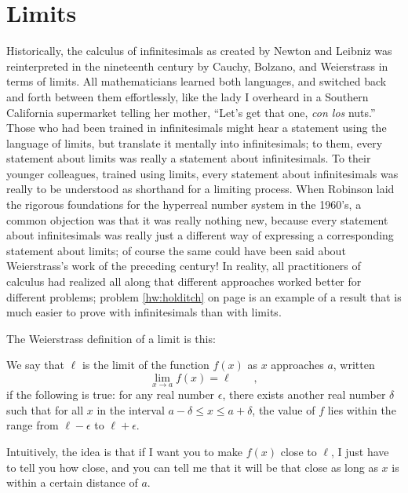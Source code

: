 \section{Limits}\label{sec:limits}

Historically, the calculus of infinitesimals as created by Newton and Leibniz was reinterpreted
in the nineteenth century by Cauchy, Bolzano, and Weierstrass in terms of limits. All mathematicians
learned both languages, and switched back and forth between them effortlessly, like the lady I
overheard in a Southern California supermarket telling her mother, ``Let's get that one, \emph{con los} nuts.''
Those who had been trained in infinitesimals might hear a statement using the language of limits, but
translate it mentally into infinitesimals; to them, every statement about limits was really a statement
about infinitesimals. To their younger colleagues, trained using limits, every statement about infinitesimals
was really to be understood as shorthand for a limiting process. When Robinson laid the rigorous foundations
for the hyperreal number system in the 1960's, a common objection was that it was really nothing new, because
every statement about infinitesimals was really just a different way of expressing a corresponding statement
about limits; of course the same could have been said about Weierstrass's work of the preceding century!
In reality, all practitioners of calculus had realized all along that different approaches worked better for
different problems; problem \ref{hw:holditch} on page \pageref{hw:holditch} is an example of a result that
is much easier to prove with infinitesimals than with limits.

The Weierstrass definition of a limit is this:
\begin{important}
We say that $\ell$ is the limit of the function $f(x)$ as $x$ approaches $a$, written
\begin{equation*}
  \lim_{x\rightarrow a} f(x) = \ell \qquad ,
\end{equation*}
if the following is true: for any real number $\epsilon$, there exists another real number
$\delta$ such that for all $x$ in the interval $a-\delta\le x \le a+\delta$,
the value of $f$ lies within the range from $\ell-\epsilon$ to $\ell+\epsilon$.
\end{important}
Intuitively, the idea is that if I want you to make $f(x)$ close to $\ell$, I just have
to tell you how close, and you can tell me that it will be that close as long as
$x$ is within a certain distance of $a$.

